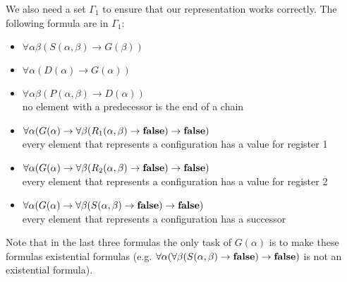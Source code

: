 We also need a set $\Gamma_1$ to ensure that our representation works correctly. The following formula are in $\Gamma_1$:
\begin{itemize}
	\item $\forall\alpha\beta(S(\alpha,\beta)\to G(\beta))$
	\item $\forall\alpha(D(\alpha)\to G(\alpha))$
	\item $\forall\alpha\beta(P(\alpha,\beta)\to D(\alpha))$\\no element with a predecessor is the end of a chain	
	\item $\forall\alpha(G(\alpha)\to\forall\beta(R_1(\alpha,\beta)\to\textbf{false})\to\textbf{false})$\\every element that represents a configuration has a value for register 1
	\item $\forall\alpha(G(\alpha)\to\forall\beta(R_2(\alpha,\beta)\to\textbf{false})\to\textbf{false})$\\every element that represents a configuration has a value for register 2
	\item $\forall\alpha(G(\alpha)\to\forall\beta(S(\alpha,\beta)\to\textbf{false})\to\textbf{false})$\\every element that represents a configuration has a successor
\end{itemize}
Note that in the last three formulas the only task of $G(\alpha)$ is to make these formulas existential formulas (e.g. $\forall\alpha(\forall\beta(S(\alpha,\beta)\to\textbf{false})\to\textbf{false})$ is not an existential formula). 

